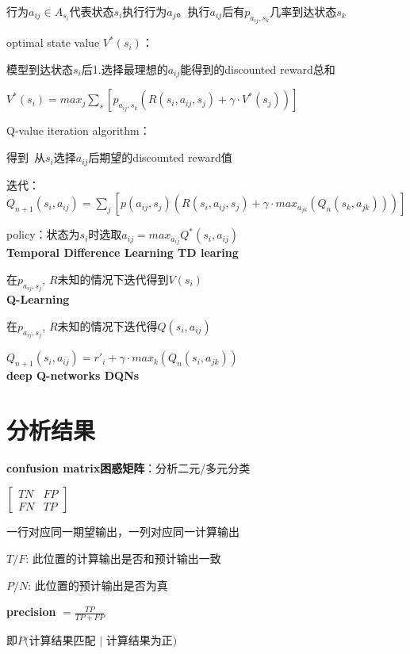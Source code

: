 \documentclass[UTF8]{ctexart}
\begin{document}
  行为$a_{ij} \in A_{s_i}$代表状态$s_i$执行行为$a_j$。执行$a_{ij}$后有$p_{a_{ij}, s_k}$几率到达状态$s_k$

  optimal state value $V^*(s_i)$：
  
  \quad 模型到达状态$s_i$后1.选择最理想的$a_{ij}$能得到的discounted reward总和

  \quad $V^*(s_i) = max_j \sum_s [p_{a_{ij}, s_k} (R(s_i, a_{ij}, s_j) + \gamma \cdot V^*(s_j))]$
  
  Q-value iteration algorithm：

  \quad 得到\ 从$s_i$选择$a_{ij}$后期望的discounted reward值

  \quad 迭代：$Q_{n+1}(s_i, a_{ij}) = \sum_j [p(a_{ij}, s_j) (R(s_i, a_{ij}, s_j) + \gamma \cdot max_{a_{jk}} (Q_n(s_k, a_{jk})))]$
  
  policy：状态为$s_i$时选取$a_{ij} = max_{a_{ij}} Q^*(s_i, a_{ij})$\\
\textbf{Temporal Difference Learning TD learing}

  在$p_{a_{ij}, s_j}$, $R$未知的情况下迭代得到$V(s_i)$\\
\textbf{Q-Learning}

  在$p_{a_{ij}, s_j}$, $R$未知的情况下迭代得$Q(s_i, a_{ij})$

  $Q_{n+1}(s_i, a_{ij}) = r'_i + \gamma \cdot max_k (Q_{n}(s_i, a_{jk}))$\\
\textbf{deep Q-networks DQNs}

  
\section{分析结果}
\noindent \textbf{confusion matrix困惑矩阵}：分析二元/多元分类
  
  $\begin{bmatrix}
    TN & FP \\
    FN & TP
  \end{bmatrix}$

  一行对应同一期望输出，一列对应同一计算输出

  $T/F$: 此位置的计算输出是否和预计输出一致

  $P/N$: 此位置的预计输出是否为真

  \textbf{precision} $= \frac{TP}{TP + FP}$

  \quad 即$P($计算结果匹配 $|$ 计算结果为正$)$
\end{document}
